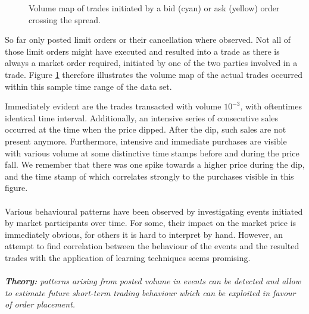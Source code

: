 \begin{figure}[H]
    \centering
    \caption{Volume map of trades initiated by a bid (cyan) or ask (yellow) order crossing the spread.}
    \label{fig:data-volmap-traded}
\end{figure}

So far only posted limit orders or their cancellation where observed.
Not all of those limit orders might have executed and resulted into a trade as there is always a market order required, initiated by one of the two parties involved in a trade.
Figure \ref{fig:data-volmap-traded} therefore illustrates the volume map of the actual trades occurred within this sample time range of the data set.

Immediately evident are the trades transacted with volume $10^{-3}$, with oftentimes identical time interval.
Additionally, an intensive series of consecutive sales occurred at the time when the price dipped.
After the dip, such sales are not present anymore.
Furthermore, intensive and immediate purchases are visible with various volume at some distinctive time stamps before and during the price fall.
We remember that there was one spike towards a higher price during the dip, and the time stamp of which correlates strongly to the purchases visible in this figure.
\\
\\
Various behavioural patterns have been observed by investigating events initiated by market participants over time.
For some, their impact on the market price is immediately obvious, for others it is hard to interpret by hand.
However, an attempt to find correlation between the behaviour of the events and the resulted trades with the application of learning techniques seems promising.
\\
\\
\textit{\textbf{Theory:} patterns arising from posted volume in events can be detected and allow to estimate future short-term trading behaviour which can be exploited in favour of order placement.}


